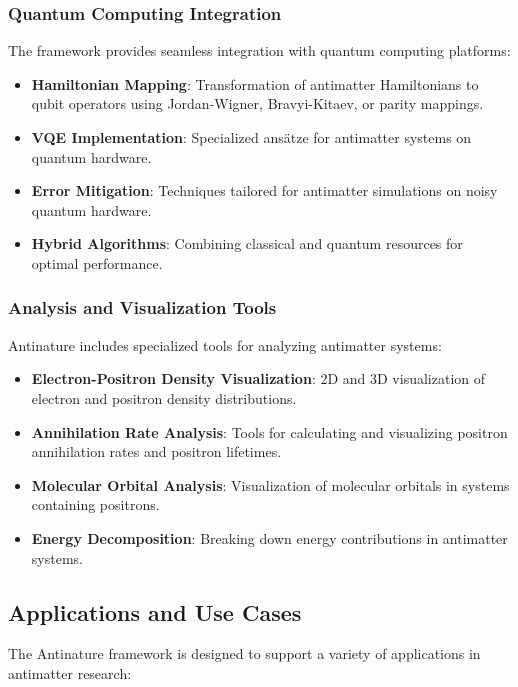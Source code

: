 \documentclass[10pt,twocolumn,a4paper]{article}
\begin{document}
\subsubsection{Quantum Computing Integration}
The framework provides seamless integration with quantum computing platforms:

\begin{itemize}
    \item \textbf{Hamiltonian Mapping}: Transformation of antimatter Hamiltonians to qubit operators using Jordan-Wigner, Bravyi-Kitaev, or parity mappings.
    
    \item \textbf{VQE Implementation}: Specialized ansätze for antimatter systems on quantum hardware.
    
    \item \textbf{Error Mitigation}: Techniques tailored for antimatter simulations on noisy quantum hardware.
    
    \item \textbf{Hybrid Algorithms}: Combining classical and quantum resources for optimal performance.
\end{itemize}

\subsubsection{Analysis and Visualization Tools}
Antinature includes specialized tools for analyzing antimatter systems:

\begin{itemize}
    \item \textbf{Electron-Positron Density Visualization}: 2D and 3D visualization of electron and positron density distributions.
    
    \item \textbf{Annihilation Rate Analysis}: Tools for calculating and visualizing positron annihilation rates and positron lifetimes.
    
    \item \textbf{Molecular Orbital Analysis}: Visualization of molecular orbitals in systems containing positrons.
    
    \item \textbf{Energy Decomposition}: Breaking down energy contributions in antimatter systems.
\end{itemize}

\subsection{Applications and Use Cases}
The Antinature framework is designed to support a variety of applications in antimatter research:
\end{document}
